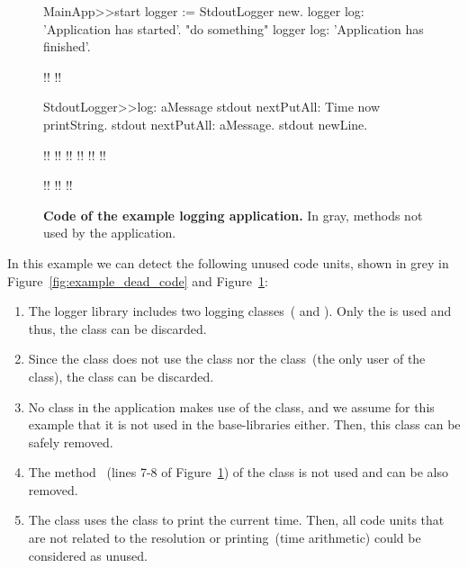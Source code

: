 \begin{figure}[ht]
\begin{code}
MainApp>>start
    logger := StdoutLogger new.
    logger log: 'Application has started'.
    "do something"
    logger log: 'Application has finished'.

!!
!!

StdoutLogger>>log: aMessage
    stdout nextPutAll: Time now printString.
    stdout nextPutAll: aMessage.
    stdout newLine.
    
!!
!!
!!
!!
!!
!!

!!
!!
!!
\end{code}

\caption{ \small\textbf{Code of the example logging application.} In gray, methods not used by the application.\label{fig:code_example1}}
\end{figure}

In this example we can detect the following unused code units, shown in grey in Figure~\ref{fig:example_dead_code} and Figure~\ref{fig:code_example1}:
\begin{enumerate}
\item The logger library includes two logging classes~( and ). Only the  is used and thus, the  class can be discarded.
\item Since the  class does not use the  class nor the  class~(the only user of the  class), the  class can be discarded.
\item No class in the application makes use of the  class, and we assume for this example that it is not used in the base-libraries either. Then, this class can be safely removed.
\item The method ~(lines 7-8 of Figure~\ref{fig:code_example1}) of the  class is not used and can be also removed.
\item The  class uses the  class to print the current time. Then, all code units that are not related to the  resolution or printing~(\ie time arithmetic) could be considered as unused.
\end{enumerate}

